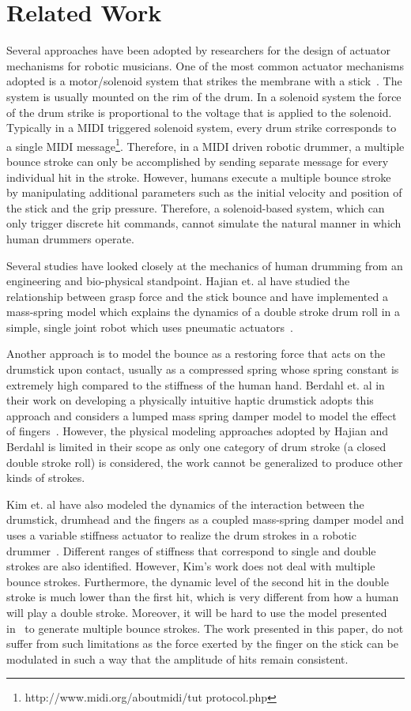 \documentclass[final,1p,times]{elsarticle}
\begin{document}
\section{Related Work}	
Several approaches have been adopted by researchers for the design of actuator mechanisms for robotic musicians. One of the most common actuator
mechanisms adopted is a motor/solenoid system that strikes the membrane
with a stick~\cite{kapur2007comparison}. The system is usually mounted on the rim of the drum. In a solenoid system the force of the drum strike is proportional to the voltage that is applied to the solenoid. Typically in a MIDI triggered solenoid system, every drum strike corresponds to a single MIDI message\footnote{http://www.midi.org/aboutmidi/tut protocol.php}. Therefore, in a MIDI driven robotic drummer, a multiple bounce stroke can only be accomplished by sending separate message for every individual hit in the stroke. However, humans execute a multiple bounce stroke by manipulating additional parameters such as the initial velocity and position of the stick and the grip pressure. Therefore, a solenoid-based system, which can only trigger discrete hit commands, cannot simulate the natural manner in which human drummers operate.

Several studies have looked closely at the mechanics of human drumming
from an engineering and bio-physical standpoint. Hajian et. al have studied the relationship between grasp force and the stick bounce and have implemented a mass-spring model which explains the dynamics of a double stroke drum roll in a simple, single joint robot which uses pneumatic actuators~\cite{hajian1997drum}.

Another approach is to model the bounce as a restoring force that acts
on the drumstick upon contact, usually as a compressed spring whose spring
constant is extremely high compared to the stiffness of the human hand.
Berdahl et. al in their work on developing a physically intuitive haptic drumstick adopts this approach and considers a lumped mass spring damper model to model the effect of fingers~\cite{berdahl2007physically}. However, the physical modeling approaches adopted by Hajian and Berdahl is
limited in their scope as only one category of drum stroke (a closed double stroke roll) is considered, the work cannot be generalized to produce other kinds of strokes.

Kim et. al have also modeled the dynamics of the interaction between the drumstick, drumhead and the fingers as a coupled mass-spring damper model and uses a variable stiffness actuator to realize the drum strokes in a robotic drummer~\cite{kim2014drum}. Different ranges of stiffness that correspond to single and double strokes are also identified. However, Kim's work does not deal with multiple bounce strokes. Furthermore, the dynamic level of the second hit in the double stroke is much lower than the first hit, which is very different from how a human will play a double stroke. Moreover, it will be hard to use the model presented in~\cite{kim2014drum} to generate multiple bounce strokes. The work presented in this paper, do not suffer from such limitations as the force exerted by the finger on the stick can be modulated in such a way that the amplitude of hits remain consistent. 	
\end{document}
